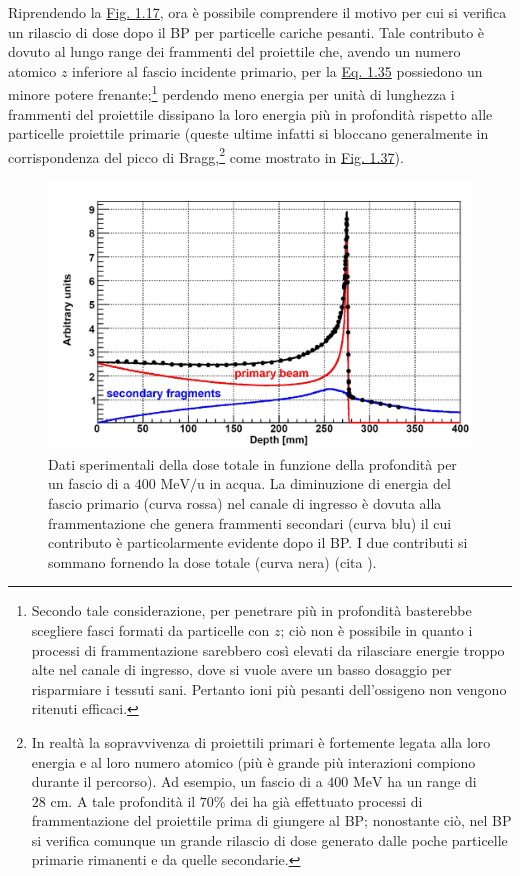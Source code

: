 \documentclass[12pt,a4paper,twoside]{report}
\begin{document}
	 Riprendendo la \hyperref[fig:photon]{Fig. 1.17}, ora è possibile comprendere il motivo per cui si verifica un rilascio di dose dopo il BP per particelle cariche pesanti. Tale contributo è dovuto al lungo range dei frammenti del proiettile che, avendo un numero atomico $z$ inferiore al fascio incidente primario, per la \hyperref[eq:bethe_bloch]{Eq. 1.35} possiedono un minore potere frenante;\footnote{Secondo tale considerazione, per penetrare più in profondità basterebbe scegliere fasci formati da particelle con $z$; ciò non è possibile in quanto i processi di frammentazione sarebbero così elevati da rilasciare energie troppo alte nel canale di ingresso, dove si vuole avere un basso dosaggio per risparmiare i tessuti sani. Pertanto ioni più pesanti dell'ossigeno non vengono ritenuti efficaci.} perdendo meno energia per unità di lunghezza i frammenti del proiettile dissipano la loro energia più in profondità rispetto alle particelle proiettile primarie (queste ultime infatti si bloccano generalmente in corrispondenza del picco di Bragg,\footnote{In realtà la sopravvivenza di proiettili primari è fortemente legata alla loro energia e al loro numero atomico (più è grande più interazioni compiono durante il percorso). Ad esempio, un fascio di  a $400\mbox{ MeV}$ ha un range di $28\mbox{ cm}$. A tale profondità il $70\%$ dei  ha già effettuato processi di frammentazione del proiettile prima di giungere al BP; nonostante ciò, nel BP si verifica comunque un grande rilascio di dose generato dalle poche particelle primarie rimanenti e da quelle secondarie.} come mostrato in \hyperref[fig:late_release]{Fig. 1.37}).
	 
	 \begin{figure}[H]
	 	\centering
	 	\includegraphics[width=0.9\linewidth]{late_release.jpg}
	 	\caption{Dati sperimentali della dose totale in funzione della profondità per un fascio di  a $400\mbox{ MeV/u}$ in acqua. La diminuzione di energia del fascio primario (curva rossa) nel canale di ingresso è dovuta alla frammentazione che genera frammenti secondari (curva blu) il cui contributo è particolarmente evidente dopo il BP. I due contributi si sommano fornendo la dose totale (curva nera) (cita
	 		).}
	 	\label{fig:late_release}
	 \end{figure}
	 
\end{document}

